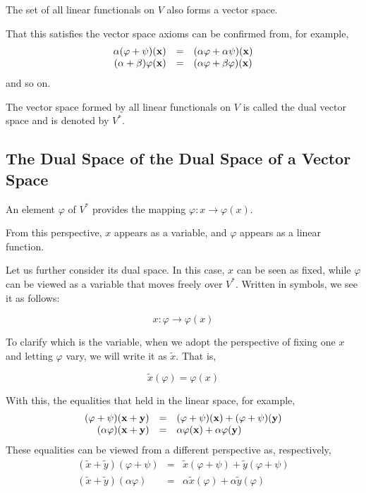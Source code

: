 \documentclass[uplatex,a4j,12pt,dvipdfmx]{jsarticle}
\begin{document}
The set of all linear functionals on $V$ also forms a vector space.

That this satisfies the vector space axioms can be confirmed from, for example,
\[
	\begin{array}{rcl}
		\alpha (\varphi + \psi) (\bf{x} ) & = & ( \alpha \varphi + \alpha \psi) (\bf{x} )
		\\
		(\alpha + \beta) \varphi (\bf{x}) & = & (\alpha \varphi + \beta \varphi) (\bf{x})
	\end{array}
\]
and so on.

The vector space formed by all linear functionals on $V$ is called the dual vector space and is denoted by $V^{*}$.

\subsection{The Dual Space of the Dual Space of a Vector Space}

An element $\varphi$ of $V^{*}$ provides the mapping $\varphi : x \to \varphi(x)$.

From this perspective, $x$ appears as a variable, and $\varphi$ appears as a linear function.

Let us further consider its dual space.
In this case, $x$ can be seen as fixed, while $\varphi$ can be viewed as a variable that moves freely over $V^{*}$.
Written in symbols, we see it as follows:

$$
	x : \varphi \to \varphi(x)
$$

To clarify which is the variable, when we adopt the perspective of fixing one $x$ and letting $\varphi$ vary, we will write it as $\tilde{x}$.
That is,

$$
	\tilde{x}(\varphi) = \varphi(x)
$$

With this, the equalities that held in the linear space, for example,
\[
	\begin{array}{rcl}
		(\varphi + \psi) (\bf{x} + \bf{y})
		 & = &
		(\varphi + \psi) (\bf{x}) + (\varphi + \psi) (\bf{y})
		\\
		(\alpha \varphi) (\bf{x} + \bf{y})
		 & = &
		\alpha \varphi (\bf{x}) + \alpha \varphi (\bf{y})
	\end{array}
\]
These equalities can be viewed from a different perspective as, respectively,
\[
	\begin{array}{rcl}
		(\tilde{x} + \tilde{y} ) (\varphi + \psi)
		 & = &
		\tilde{x} (\varphi + \psi)  + \tilde{y} (\varphi + \psi)
		\\
		(\tilde{x} + \tilde{y} ) (\alpha \varphi)
		 & = &
		\alpha \tilde{x} (\varphi) + \alpha \tilde{y} (\varphi)
	\end{array}
\]
\end{document}
